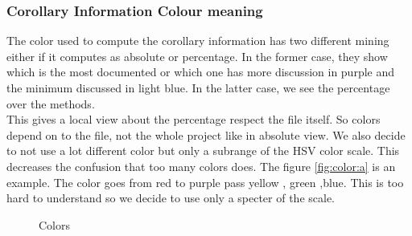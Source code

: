 \documentclass[]{usiinfbachelorproject}
\begin{document}
\subsubsection{Corollary Information Colour meaning}
The color used to compute the corollary information has two different mining either if it computes as absolute or percentage. In the former case, they show which is the most documented or which one has more discussion in purple and the minimum discussed in light blue. In the latter case, we see the percentage over the methods.\\ This gives a local view about the percentage respect the file itself. So colors depend on to the file, not the whole project like in absolute view. We also decide to not use a lot different color but only a subrange of the HSV color scale. This decreases the confusion that too many colors does. The figure \ref{fig:color:a} is an example. The color goes from red to purple pass yellow , green ,blue. This is too hard to understand so we decide to use only a specter of the scale.




 
\begin{figure}[h]
\centering
{}
\hspace*{\fill}

\caption{Colors}
\label{fig:color}
\end{figure}
\end{document}
